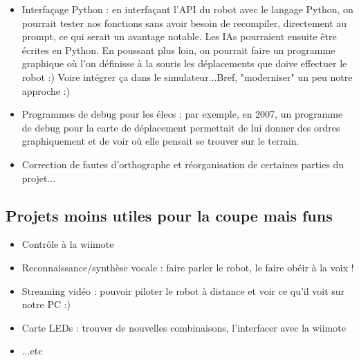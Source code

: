 \begin{itemize}
\item Interfaçage Python : en interfaçant l'API du robot avec le langage Python, on pourrait tester nos fonctions sans avoir besoin de recompiler, directement au prompt, ce qui serait un avantage notable. Les IAs pourraient ensuite être écrites en Python. En poussant plus loin, on pourrait faire un programme graphique où l'on définisse à la souris les déplacements que doive effectuer le robot :) Voire intégrer ça dans le simulateur...Bref, "moderniser" un peu notre approche :)\\
\item Programmes de debug pour les élecs : par exemple, en 2007, un programme de debug pour la carte de déplacement permettait de lui donner des ordres graphiquement et de voir où elle pensait se trouver sur le terrain.\\
\item Correction de fautes d'orthographe et réorganisation de certaines parties du projet...\\
\end{itemize}

\subsection{Projets moins utiles pour la coupe mais funs}
\begin{itemize}
\item Contrôle à la wiimote\\
\item Reconnaissance/synthèse vocale : faire parler le robot, le faire obéir à la voix !\\
\item Streaming vidéo : pouvoir piloter le robot à distance et voir ce qu'il voit sur notre PC :)\\
\item Carte LEDs : trouver de nouvelles combinaisons, l'interfacer avec la wiimote\\
\item ...etc\\
\end{itemize}